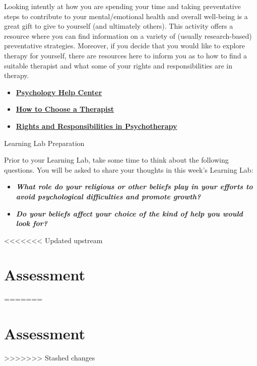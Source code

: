 \documentclass[
]{book}
\providecommand{\tightlist}{%
  \setlength{\itemsep}{0pt}\setlength{\parskip}{0pt}}
\begin{document}
\begin{reflect}
Looking intently at how you are spending your time and taking preventative steps to contribute to your mental/emotional health and overall well-being is a great gift to give to yourself (and ultimately others). This activity offers a resource where you can find information on a variety of (usually research-based) preventative strategies. Moreover, if you decide that you would like to explore therapy for yourself, there are resources here to inform you as to how to find a suitable therapist and what some of your rights and responsibilities are in therapy.

\begin{itemize}
\tightlist
\item
  \href{https://www.apa.org/helpcenter/}{\textbf{Psychology Help Center}}\\
\item
  \href{http://psychcentral.com/therapst.htm}{\textbf{How to Choose a Therapist}}\\
\item
  \href{assets/unit_12/Rights-and-Responsibilities-in-Psychotherapy.pdf}{\textbf{Rights and Responsibilities in Psychotherapy}}
\end{itemize}

{Learning Lab Preparation}

Prior to your Learning Lab, take some time to think about the following questions. You will be asked to share your thoughts in this week's Learning Lab:

\begin{itemize}
\tightlist
\item
  \textbf{\emph{What role do your religious or other beliefs play in your efforts to avoid psychological difficulties and promote growth?}}
\item
  \textbf{\emph{Do your beliefs affect your choice of the kind of help you would look for?}}
\end{itemize}
\end{reflect}

<<<<<<< Updated upstream
\hypertarget{assessment-11}{%
\section*{Assessment}\label{assessment-11}}
=======
\hypertarget{assessment-10}{%
\section*{Assessment}\label{assessment-10}}
>>>>>>> Stashed changes
\end{document}
